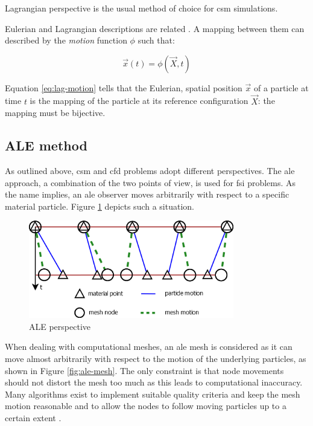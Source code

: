 Lagrangian perspective is the usual method of choice for \acrfull{csm} simulations.

Eulerian and Lagrangian descriptions are related \cite{bertram2012elasticity}. A mapping between them can described by the \textit{motion} function $\phi$ such that:


\begin{equation}
\vec{x}(t) = \phi(\vec{X}, t)
\label{eq:lag-motion}
\end{equation}

Equation \ref{eq:lag-motion} tells that the Eulerian, spatial position $\vec{x}$ of a particle at time $t$ is the mapping of the particle at its reference configuration $\vec{X}$: the mapping must be bijective.

\subsection{ALE method}
\label{subsec:ALE}

As outlined above, \acrshort{csm} and \acrshort{cfd} problems adopt different perspectives. The \acrfull{ale} approach, a combination of the two points of view, is used for \acrshort{fsi} problems. As the name implies, an \acrshort{ale} observer moves arbitrarily with respect to a specific material particle.
Figure \ref{fig:ale} depicts such a situation.

\begin{figure}[htbp!]
	\centering
	\includegraphics[width=0.8\textwidth]{images/ale}
	\caption{ALE perspective}
	\label{fig:ale}
\end{figure}

When dealing with computational meshes, an \acrshort{ale} mesh is considered as it can move almost arbitrarily with respect to the motion of the underlying particles, as shown in Figure \ref{fig:ale-mesh}.
The only constraint is that node movements should not distort the mesh too much as this leads to computational inaccuracy. Many algorithms exist to implement suitable quality criteria and keep the mesh motion reasonable and to allow the nodes to follow moving particles up to a certain extent \cite{de2007mesh}.


